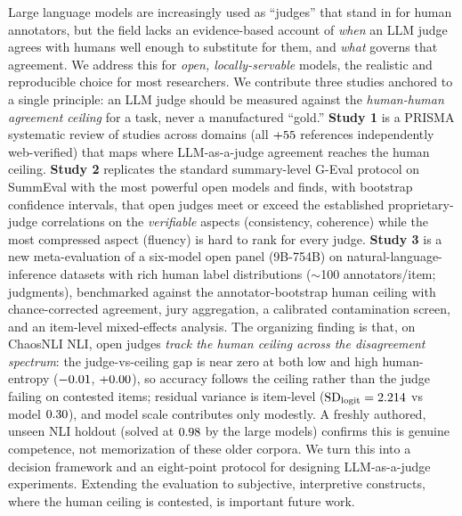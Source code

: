 \noindent
Large language models are increasingly used as ``judges'' that stand in for human annotators, but the field lacks
an evidence-based account of \emph{when} an LLM judge agrees with humans well enough to substitute for them, and
\emph{what} governs that agreement. We address this for \emph{open, locally-servable} models, the realistic and
reproducible choice for most researchers. We contribute three studies anchored to a single principle: an LLM judge
should be measured against the \emph{human-human agreement ceiling} for a task, never a manufactured ``gold.''
\textbf{Study 1} is a PRISMA systematic review of \Nstudies{} studies across \Ndomains{} domains (all
\Nstudies{}${+}55$ references independently web-verified) that maps where LLM-as-a-judge agreement reaches the
human ceiling. \textbf{Study 2} replicates the standard summary-level G-Eval protocol on SummEval with the most
powerful open models and finds, with bootstrap confidence intervals, that open judges meet or exceed the established
proprietary-judge correlations on the \emph{verifiable} aspects (consistency, coherence) while the most compressed
aspect (fluency) is hard to rank for every judge. \textbf{Study 3} is a new meta-evaluation of a six-model open
panel (9B-754B) on natural-language-inference datasets with rich human label distributions ($\sim$100
annotators/item; \NLInjudg{} judgments), benchmarked against the annotator-bootstrap human ceiling with
chance-corrected agreement, jury aggregation, a calibrated contamination screen, and an item-level mixed-effects
analysis. The organizing finding is that, on ChaosNLI NLI, open judges \emph{track the human ceiling across the disagreement spectrum}: the
judge-vs-ceiling gap is near zero at both low and high human-entropy ($-0.01$, $+0.00$), so accuracy
follows the ceiling rather than the judge failing on contested items; residual variance is item-level
($\mathrm{SD}_{\text{logit}}=2.214$ vs model $0.30$), and model scale contributes only modestly.
A freshly authored, unseen NLI holdout (solved at $0.98$ by the large models) confirms this is genuine competence,
not memorization of these older corpora. We turn
this into a decision framework and an eight-point protocol for designing LLM-as-a-judge experiments. Extending the
evaluation to subjective, interpretive constructs, where the human ceiling is contested, is important future work.
